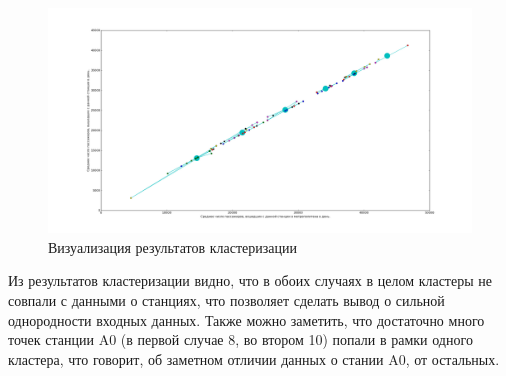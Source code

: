 \documentclass[12pt,a4paper,oneside]{extarticle}
\begin{document}
        \begin{figure}[ht!]
            \center
            \includegraphics[scale=0.3]{figure_2.png}
            \caption{Визуализация результатов кластеризации}
            \label{pic:case1}
        \end{figure}

    Из результатов кластеризации видно, что в обоих случаях в целом кластеры не совпали с данными о станциях, что позволяет сделать вывод о сильной однородности входных данных. Также можно заметить, что достаточно много точек станции A0 (в первой случае 8, во втором 10) попали в рамки одного кластера, что говорит, об заметном отличии данных о стании A0, от остальных.
\end{document}
